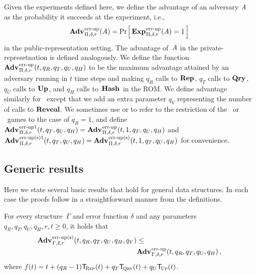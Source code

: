Given the experiments defined here, we define the advantage of an adversary
$\mathit{A}$ as the probability it succeeds at the experiment, i.e.,
\[\Adv{\errep}_{\struct,\delta,r}(\advA) = \Prob{\Exp{\errep}_{\struct,\delta,r}(\advA) = 1}\]
in the public-representation setting. The advantage of~$\mathit{A}$ in the
private-represetnation is defined analogously.
%
We define the function
$\Adv{\errep}_{\struct,\delta,r}(t,q_R,q_T,q_U,q_H)$ to be the maximum advantage
attained by an adversary running in $t$ time steps and making $q_R$ calls to
$\textup{\textbf{Rep}}\hspace{0.5pt}$, $q_T$ calls to $\textup{\textbf{Qry}}\hspace{0.5pt}$, $q_U$ calls to $\textup{\textbf{Up}}\hspace{0.5pt}$, and $q_H$ calls
to~$\textup{\textbf{Hash}}\hspace{0.5pt}$ in the ROM. We define advantage similarly for \erreps\ except that
we add an extra parameter $q_V$ representing the number of calls to $\mathbf{Reveal}$. We
sometimes use  or  to refer to the restriction of the \errep\ or
\erreps\ games to the case of $q_R = 1$, and define
$\Adv{\errep1}_{\struct,\delta,r}(t,q_T,q_U,q_H) = \Adv{\errep}_{\struct,\delta,r}(t,1,q_T,q_U,q_H)$
and $\Adv{\erreps1}_{\struct,\delta,r}(t,q_T,q_U,q_H) = \Adv{\erreps}_{\struct,\delta,r}(t,1,q_T,q_U,q_H)$
for convenience.

\subsection{Generic results}



Here we state several basic results that hold for general data structures. In
each case the proofs follow in a straightforward manner from the definitions.

\begin{lemma}\label{thm:errep-to-erreps}
  For every structure~$\Gamma$ and error function $\delta$ and any parameters
  $q_R, q_T, q_U, q_H, r, t \geq 0$, it holds that
  \begin{eqnarray*}
    \begin{aligned}
      \Adv{\erreps}_{\Gamma,\delta,r}(t, q_R, q_T, q_U, q_H, q_V) &\leq \\
      & \Adv{\errep}_{\Gamma,\delta,r}(t, q_R, q_T, q_U, q_H) \,,
    \end{aligned}
  \end{eqnarray*}
  where $f(t) = t + (q_R-1)\ticks(\Rep,t) + q_T\ticks(\Qry,t) + q_U\ticks(\Up,t)$.
\end{lemma}

